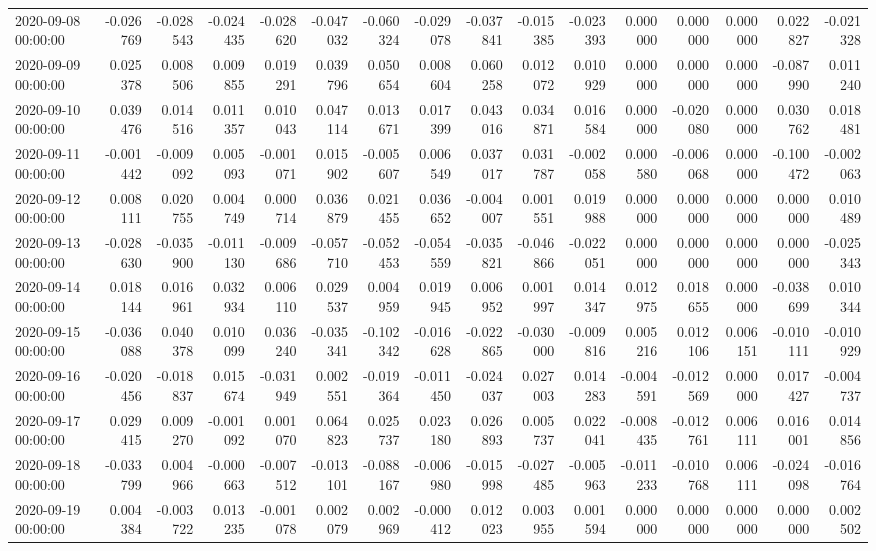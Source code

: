 \begin{tabular}{lrrrrrrrrrrrrrrr}
2020-09-08 00:00:00 & -0.026769 & -0.028543 & -0.024435 & -0.028620 & -0.047032 & -0.060324 & -0.029078 & -0.037841 & -0.015385 & -0.023393 & 0.000000 & 0.000000 & 0.000000 & 0.022827 & -0.021328 \\
2020-09-09 00:00:00 & 0.025378 & 0.008506 & 0.009855 & 0.019291 & 0.039796 & 0.050654 & 0.008604 & 0.060258 & 0.012072 & 0.010929 & 0.000000 & 0.000000 & 0.000000 & -0.087990 & 0.011240 \\
2020-09-10 00:00:00 & 0.039476 & 0.014516 & 0.011357 & 0.010043 & 0.047114 & 0.013671 & 0.017399 & 0.043016 & 0.034871 & 0.016584 & 0.000000 & -0.020080 & 0.000000 & 0.030762 & 0.018481 \\
2020-09-11 00:00:00 & -0.001442 & -0.009092 & 0.005093 & -0.001071 & 0.015902 & -0.005607 & 0.006549 & 0.037017 & 0.031787 & -0.002058 & 0.000580 & -0.006068 & 0.000000 & -0.100472 & -0.002063 \\
2020-09-12 00:00:00 & 0.008111 & 0.020755 & 0.004749 & 0.000714 & 0.036879 & 0.021455 & 0.036652 & -0.004007 & 0.001551 & 0.019988 & 0.000000 & 0.000000 & 0.000000 & 0.000000 & 0.010489 \\
2020-09-13 00:00:00 & -0.028630 & -0.035900 & -0.011130 & -0.009686 & -0.057710 & -0.052453 & -0.054559 & -0.035821 & -0.046866 & -0.022051 & 0.000000 & 0.000000 & 0.000000 & 0.000000 & -0.025343 \\
2020-09-14 00:00:00 & 0.018144 & 0.016961 & 0.032934 & 0.006110 & 0.029537 & 0.004959 & 0.019945 & 0.006952 & 0.001997 & 0.014347 & 0.012975 & 0.018655 & 0.000000 & -0.038699 & 0.010344 \\
2020-09-15 00:00:00 & -0.036088 & 0.040378 & 0.010099 & 0.036240 & -0.035341 & -0.102342 & -0.016628 & -0.022865 & -0.030000 & -0.009816 & 0.005216 & 0.012106 & 0.006151 & -0.010111 & -0.010929 \\
2020-09-16 00:00:00 & -0.020456 & -0.018837 & 0.015674 & -0.031949 & 0.002551 & -0.019364 & -0.011450 & -0.024037 & 0.027003 & 0.014283 & -0.004591 & -0.012569 & 0.000000 & 0.017427 & -0.004737 \\
2020-09-17 00:00:00 & 0.029415 & 0.009270 & -0.001092 & 0.001070 & 0.064823 & 0.025737 & 0.023180 & 0.026893 & 0.005737 & 0.022041 & -0.008435 & -0.012761 & 0.006111 & 0.016001 & 0.014856 \\
2020-09-18 00:00:00 & -0.033799 & 0.004966 & -0.000663 & -0.007512 & -0.013101 & -0.088167 & -0.006980 & -0.015998 & -0.027485 & -0.005963 & -0.011233 & -0.010768 & 0.006111 & -0.024098 & -0.016764 \\
2020-09-19 00:00:00 & 0.004384 & -0.003722 & 0.013235 & -0.001078 & 0.002079 & 0.002969 & -0.000412 & 0.012023 & 0.003955 & 0.001594 & 0.000000 & 0.000000 & 0.000000 & 0.000000 & 0.002502 \\

\end{tabular}
